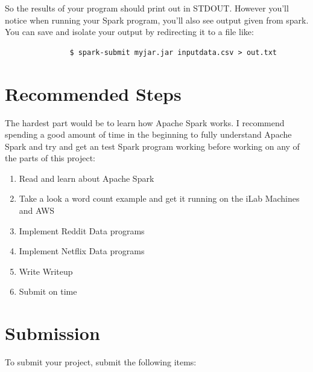 \documentclass{article}
\begin{document}
\begin{info}
So the results of your program should print out in STDOUT. However you'll notice when running your Spark program, you'll also see output given from spark. You can save and isolate your output by redirecting it to a file like:
\begin{verbatim}               $ spark-submit myjar.jar inputdata.csv > out.txt
\end{verbatim}


\end{info}



\section{Recommended Steps}
The hardest part would be to learn how Apache Spark works. I recommend spending a good amount of time in the beginning to fully understand Apache Spark and try and get an test Spark program working before working on any of the parts of this project:

\begin{enumerate}
    \item Read and learn about Apache Spark 
    \item Take a look a word count example and get it running on the iLab Machines and AWS 
    \item Implement Reddit Data programs 
    \item Implement Netflix Data programs
    \item Write Writeup 
    \item Submit on time
\end{enumerate}

\section{Submission}
To submit your project, submit the following items:
\end{document}
